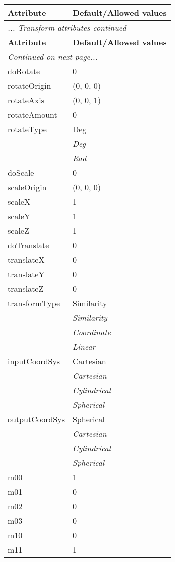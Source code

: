 \documentclass[10pt,a4paper]{report}
\begin{document}
\begin{longtable}{ll}
{\bf Attribute} & {\bf Default/Allowed values} \\
\hline \hline
\endfirsthead
\multicolumn{2}{l}{{\it ... Transform attributes continued}} \\
{\bf Attribute} & {\bf Default/Allowed values} \\
\hline \hline
\endhead
\hline
\multicolumn{2}{l}{{\it Continued on next page...}} \\
\endfoot
\hline
\endlastfoot

doRotate  &  0 \\
rotateOrigin  &  (0, 0, 0) \\
rotateAxis  &  (0, 0, 1) \\
rotateAmount  &  0 \\
rotateType  &  Deg   \\
 & {\it  Deg} \\
 & {\it  Rad} \\
doScale  &  0 \\
scaleOrigin  &  (0, 0, 0) \\
scaleX  &  1 \\
scaleY  &  1 \\
scaleZ  &  1 \\
doTranslate  &  0 \\
translateX  &  0 \\
translateY  &  0 \\
translateZ  &  0 \\
transformType  &  Similarity   \\
 & {\it  Similarity} \\
 & {\it  Coordinate} \\
 & {\it  Linear} \\
inputCoordSys  &  Cartesian   \\
 & {\it  Cartesian} \\
 & {\it  Cylindrical} \\
 & {\it  Spherical} \\
outputCoordSys  &  Spherical   \\
 & {\it  Cartesian} \\
 & {\it  Cylindrical} \\
 & {\it  Spherical} \\
m00  &  1 \\
m01  &  0 \\
m02  &  0 \\
m03  &  0 \\
m10  &  0 \\
m11  &  1 \\

\end{longtable}
\end{document}
